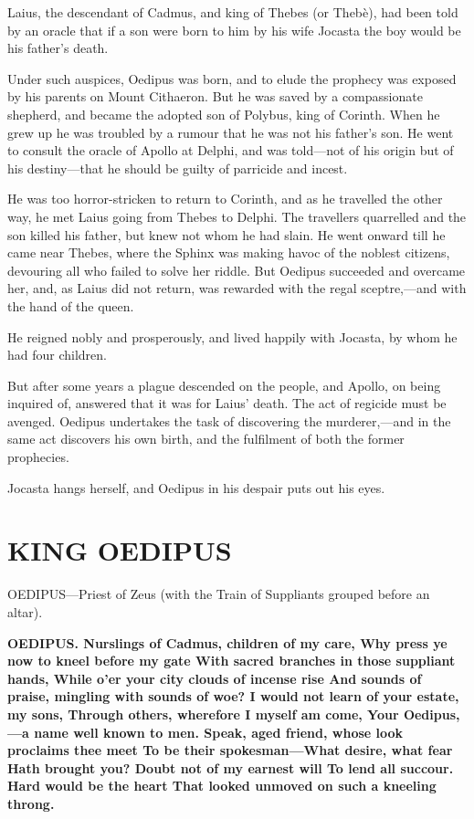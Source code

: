 \documentclass[11pt,letter]{book}
\begin{document}
\par  [page 84] Laius, the descendant of Cadmus, and king of Thebes (or Thebè), had been told by an oracle that if a son were born to him by his wife Jocasta the boy would be his father’s death.

\par  Under such auspices, Oedipus was born, and to elude the prophecy was exposed by his parents on Mount Cithaeron. But he was saved by a compassionate shepherd, and became the adopted son of Polybus, king of Corinth. When he grew up he was troubled by a rumour that he was not his father’s son. He went to consult the oracle of Apollo at Delphi, and was told—not of his origin but of his destiny—that he should be guilty of parricide and incest.

\par  He was too horror-stricken to return to Corinth, and as he travelled the other way, he met Laius going from Thebes to Delphi. The travellers quarrelled and the son killed his father, but knew not whom he had slain. He went onward till he came near Thebes, where the Sphinx was making havoc of the noblest citizens, devouring all who failed to solve her riddle. But Oedipus succeeded and overcame her, and, as Laius did not return, was rewarded with the regal sceptre,—and with the hand of the queen.

\par  He reigned nobly and prosperously, and lived happily with Jocasta, by whom he had four children.

\par  But after some years a plague descended on the people, and Apollo, on being inquired of, answered that it was for Laius’ death. The act of regicide must be avenged. Oedipus undertakes the task of discovering the murderer,—and in the same act discovers his own birth, and the fulfilment of both the former prophecies.

\par  Jocasta hangs herself, and Oedipus in his despair puts out his eyes.

\par  [page 85]
\section{KING OEDIPUS}
\par  OEDIPUS—Priest of Zeus (with the Train of Suppliants grouped before an altar).

\par \textbf{OEDIPUS. Nurslings of Cadmus, children of my care, Why press ye now to kneel before my gate With sacred branches in those suppliant hands, While o’er your city clouds of incense rise And sounds of praise, mingling with sounds of woe? I would not learn of your estate, my sons, Through others, wherefore I myself am come, Your Oedipus,—a name well known to men. Speak, aged friend, whose look proclaims thee meet To be their spokesman—What desire, what fear Hath brought you? Doubt not of my earnest will To lend all succour. Hard would be the heart That looked unmoved on such a kneeling throng.}
\par 
\end{document}
